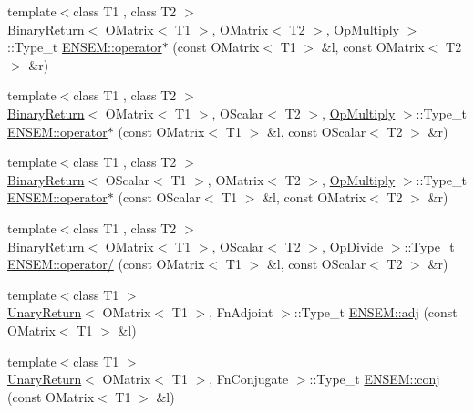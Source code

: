 \begin{DoxyCompactItemize}
\item 
{\footnotesize template$<$class T1 , class T2 $>$ }\\\mbox{\hyperlink{structBinaryReturn}{Binary\+Return}}$<$ O\+Matrix$<$ T1 $>$, O\+Matrix$<$ T2 $>$, \mbox{\hyperlink{structOpMultiply}{Op\+Multiply}} $>$\+::Type\+\_\+t \mbox{\hyperlink{group__obsmatrix_ga7c6a61b10289159298bd053adf13f1a6}{E\+N\+S\+E\+M\+::operator$\ast$}} (const O\+Matrix$<$ T1 $>$ \&l, const O\+Matrix$<$ T2 $>$ \&r)
\item 
{\footnotesize template$<$class T1 , class T2 $>$ }\\\mbox{\hyperlink{structBinaryReturn}{Binary\+Return}}$<$ O\+Matrix$<$ T1 $>$, O\+Scalar$<$ T2 $>$, \mbox{\hyperlink{structOpMultiply}{Op\+Multiply}} $>$\+::Type\+\_\+t \mbox{\hyperlink{group__obsmatrix_gaf5ede60943f488e0a637504e6838529e}{E\+N\+S\+E\+M\+::operator$\ast$}} (const O\+Matrix$<$ T1 $>$ \&l, const O\+Scalar$<$ T2 $>$ \&r)
\item 
{\footnotesize template$<$class T1 , class T2 $>$ }\\\mbox{\hyperlink{structBinaryReturn}{Binary\+Return}}$<$ O\+Scalar$<$ T1 $>$, O\+Matrix$<$ T2 $>$, \mbox{\hyperlink{structOpMultiply}{Op\+Multiply}} $>$\+::Type\+\_\+t \mbox{\hyperlink{group__obsmatrix_ga92a06278aeac18e092853d6c4cf37b0b}{E\+N\+S\+E\+M\+::operator$\ast$}} (const O\+Scalar$<$ T1 $>$ \&l, const O\+Matrix$<$ T2 $>$ \&r)
\item 
{\footnotesize template$<$class T1 , class T2 $>$ }\\\mbox{\hyperlink{structBinaryReturn}{Binary\+Return}}$<$ O\+Matrix$<$ T1 $>$, O\+Scalar$<$ T2 $>$, \mbox{\hyperlink{structOpDivide}{Op\+Divide}} $>$\+::Type\+\_\+t \mbox{\hyperlink{group__obsmatrix_gaa90c91fdbe2814bb15f1ac76012585d8}{E\+N\+S\+E\+M\+::operator/}} (const O\+Matrix$<$ T1 $>$ \&l, const O\+Scalar$<$ T2 $>$ \&r)
\item 
{\footnotesize template$<$class T1 $>$ }\\\mbox{\hyperlink{structUnaryReturn}{Unary\+Return}}$<$ O\+Matrix$<$ T1 $>$, Fn\+Adjoint $>$\+::Type\+\_\+t \mbox{\hyperlink{group__obsmatrix_gab99c32b7f3eabbe8b6a6ec2834914c88}{E\+N\+S\+E\+M\+::adj}} (const O\+Matrix$<$ T1 $>$ \&l)
\item 
{\footnotesize template$<$class T1 $>$ }\\\mbox{\hyperlink{structUnaryReturn}{Unary\+Return}}$<$ O\+Matrix$<$ T1 $>$, Fn\+Conjugate $>$\+::Type\+\_\+t \mbox{\hyperlink{group__obsmatrix_gaa0e14166cccccfb643584dfa83138cb2}{E\+N\+S\+E\+M\+::conj}} (const O\+Matrix$<$ T1 $>$ \&l)

\end{DoxyCompactItemize}
